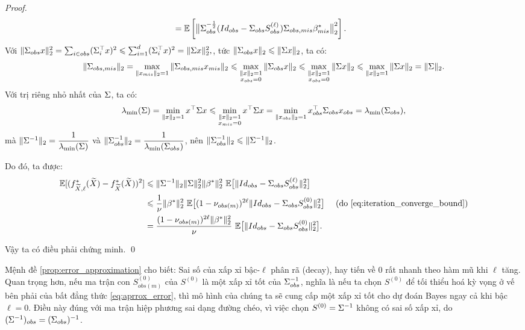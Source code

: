 \begin{proof}
\begin{align*}
        &= \mathbb{E} \left[ \big\| \Sigma_{obs}^{-\frac{1}{2}}
        ( Id_{obs} - \Sigma_{obs} S_{obs}^{(\ell)} )  \Sigma_{obs,mis} \beta_{mis}^* \big\|_2^2 \right].
    \end{align*}
    Với $
        \|\Sigma_{obs} x\|_2^2 = \sum_{i \in obs} (\Sigma_i^{\top} x)^2 \leqslant \sum_{i=1}^d (\Sigma_i^{\top} x)^2 = \|\Sigma x\|_2^2,
    $, tức $\|\Sigma_{obs} x\|_2 \leqslant \|\Sigma x\|_2$, 
    ta có:
    \[
        \|\Sigma_{obs, mis}\|_2 = \max_{\substack{\|x_{mis} \|_2 = 1}} \|\Sigma_{obs, mis} x_{mis}\|_2 
        \leqslant \max_{\substack{\|x\|_2 = 1 \\ x_{obs} = 0}} \|\Sigma_{obs} x\|_2
        \leqslant \max_{\substack{\|x\|_2 = 1 \\ x_{obs} = 0}} \|\Sigma x\|_2
        \leqslant \max_{\substack{\|x\|_2 = 1}} \|\Sigma x\|_2
        = \|\Sigma\|_2.
    \]
    Với trị riêng nhỏ nhất của $\Sigma$, ta có:
    \[
        \lambda_{\min}(\Sigma) = \min_{\substack{\|x\|_2=1}} x^{\top} \Sigma x 
        \leqslant \min_{\substack{\|x\|_2=1 \\ x_{mis}=0}} x^{\top} \Sigma x 
        = \min_{\|x_{obs}\|_2=1} x_{obs}^{\top} \Sigma_{obs} x_{obs} 
        = \lambda_{\min} (\Sigma_{obs}),
    \]
    mà $\|\Sigma^{-1}\|_2= \dfrac{1}{\lambda_{\min} (\Sigma) }$ 
    và $\|\Sigma_{obs}^{-1}\|_2 = \dfrac{1}{\lambda_{\min} (\Sigma_{obs})}$, 
    nên $\|\Sigma_{obs}^{-1}\|_2 \leqslant \|\Sigma^{-1}\|_2$.

    Do đó, ta được:
    \begin{align*}
        \E [(f_{\widetilde{X}, \ell}^*(\widetilde{X}) - f_{\widetilde{X}}^* (\widetilde{X}))^2] 
        &\leq \|\cov^{-1}\|_2 \|\cov\|_2^2 \|\beta^*\|_2^2
        \ \E\big[\| Id_{obs} - \cov_{obs} S_{obs}^{(\ell)}  \|_2^2 \big] \\
        &\leq \dfrac{1}{\nu}\|\beta^*\|_2^2 \ \E\big[(1 - \nu_{obs(m)})^{2\ell} \| Id_{obs} - \cov_{obs} S_{obs}^{(0)}  \|_2^2 \big] \quad \text{ (do \eqref{eq:iteration_converge_bound})}\\
        &= \dfrac{(1 - \nu_{obs(m)})^{2\ell}\|\beta^*\|_2^2 }{\nu} \ \E\big[ \| Id_{obs} - \cov_{obs} S_{obs}^{(0)}  \|_2^2 \big].
    \end{align*}
    
    Vậy ta có điều phải chứng minh.   \qed
\end{proof}

Mệnh đề \ref{prop:error_approximation} cho biết: 
Sai số của xấp xỉ bậc-$\ell$ phân rã (decay), hay tiến về $0$ rất nhanh theo hàm mũ khi $\ell$ tăng. Quan trọng hơn, nếu ma trận con $S^{(0)}_{obs(m)}$ của $S^{(0)}$ là một xấp xỉ tốt của $\Sigma_{obs}^{-1}$, 
nghĩa là nếu ta chọn $S^{(0)}$ để tối thiểu hoá kỳ vọng ở vế bên phải của bất đẳng thức \eqref{eq:aprrox_error}, thì mô hình của chúng ta sẽ cung cấp một xấp xỉ tốt cho dự đoán Bayes ngay cả khi bậc $\ell = 0$.
 Điều này đúng với ma trận hiệp phương sai dạng đường chéo, vì việc chọn $S^{(0)} = \Sigma^{-1}$ không có sai số xấp xỉ, do $(\Sigma^{-1})_{obs} = (\Sigma_{obs})^{-1}$.


